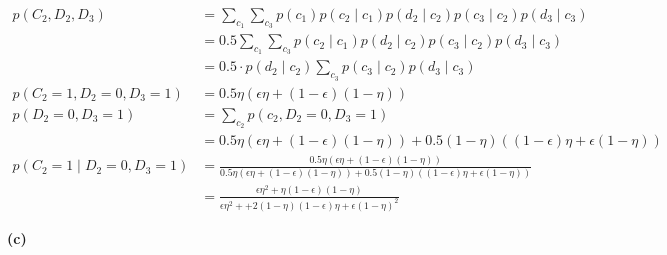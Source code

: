 \documentclass[11pt]{article}
\begin{document}
\begin{align}
	p(C_2, D_2, D_3) 
		&= \sum_{c_1} \sum_{c_3} p(c_1) p(c_2 \mid c_1) p(d_2 \mid c_2) p(c_3 \mid c_2) p(d_3 \mid c_3) \\
		&= 0.5 \sum_{c_1} \sum_{c_3} p(c_2 \mid c_1)  p(d_2 \mid c_2) p(c_3 \mid c_2) p(d_3 \mid c_3) \\
		&= 0.5 \cdot p(d_2 \mid c_2)  \sum_{c_3}  p(c_3 \mid c_2) p(d_3 \mid c_3) \\
	p(C_2=1, D_2=0, D_3=1)
		&= 0.5 \eta \left(
			\epsilon \eta + (1 - \epsilon) (1 - \eta)
		\right) \\
	p(D_2=0, D_3=1)
		&= \sum_{c_2} p(c_2, D_2=0, D_3=1) \\
		&= 0.5 \eta \left(
		\epsilon \eta + (1 - \epsilon) (1 - \eta)
		\right) + 0.5 (1 - \eta) \left(
			(1 - \epsilon) \eta + \epsilon (1 - \eta)
		\right)\\
	p(C_2=1 \mid D_2=0, D_3=1)
		&= \frac{0.5 \eta \left(
			\epsilon \eta + (1 - \epsilon) (1 - \eta)
			\right)}{0.5 \eta \left(
		\epsilon \eta + (1 - \epsilon) (1 - \eta)
	\right) + 0.5 (1 - \eta) \left(
(1 - \epsilon) \eta + \epsilon (1 - \eta)
\right)} \\
		&= \frac{\epsilon \eta^2 + \eta (1  - \epsilon) (1 - \eta)
		}{
			\epsilon \eta^2 +
			+2 (1-\eta)(1- \epsilon) \eta + \epsilon(1 - \eta)^2 
		}
\end{align}


\clearpage
\textbf{(c)}
\end{document}
